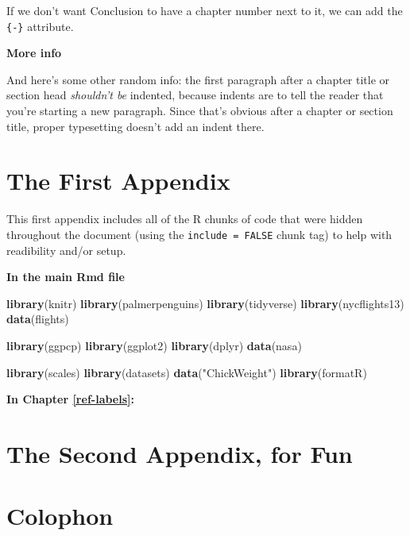 \documentclass[print]{nuthesis}
\newenvironment{Shaded}{\begin{snugshade}}{\end{snugshade}}
\newcommand{\FunctionTok}[1]{\textcolor[rgb]{0.13,0.29,0.53}{\textbf{#1}}}
\newcommand{\NormalTok}[1]{#1}
\newcommand{\StringTok}[1]{\textcolor[rgb]{0.31,0.60,0.02}{#1}}
\begin{document}
If we don't want Conclusion to have a chapter number next to it, we can add the \texttt{\{-\}} attribute.

\textbf{More info}

And here's some other random info: the first paragraph after a chapter title or section head \emph{shouldn't be} indented, because indents are to tell the reader that you're starting a new paragraph. Since that's obvious after a chapter or section title, proper typesetting doesn't add an indent there.

\appendix

\hypertarget{the-first-appendix}{%
\chapter{The First Appendix}\label{the-first-appendix}}

This first appendix includes all of the R chunks of code that were hidden throughout the document (using the \texttt{include\ =\ FALSE} chunk tag) to help with readibility and/or setup.

\textbf{In the main Rmd file}

\begin{Shaded}
\begin{Highlighting}[]
\FunctionTok{library}\NormalTok{(knitr)}
\FunctionTok{library}\NormalTok{(palmerpenguins)}
\FunctionTok{library}\NormalTok{(tidyverse)}
\FunctionTok{library}\NormalTok{(nycflights13)}
\FunctionTok{data}\NormalTok{(flights)}

\FunctionTok{library}\NormalTok{(ggpcp)}
\FunctionTok{library}\NormalTok{(ggplot2)}
\FunctionTok{library}\NormalTok{(dplyr)}
\FunctionTok{data}\NormalTok{(nasa)}

\FunctionTok{library}\NormalTok{(scales)}
\FunctionTok{library}\NormalTok{(datasets)}
\FunctionTok{data}\NormalTok{(}\StringTok{"ChickWeight"}\NormalTok{)}
\FunctionTok{library}\NormalTok{(formatR)}
\end{Highlighting}
\end{Shaded}

\textbf{In Chapter \ref{ref-labels}:}

\hypertarget{the-second-appendix-for-fun}{%
\chapter{The Second Appendix, for Fun}\label{the-second-appendix-for-fun}}

\hypertarget{colophon}{%
\chapter*{Colophon}\label{colophon}}
\end{document}
